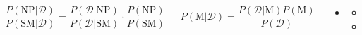 \documentclass[english]{beamer}
\begin{document}
{\begin{columns}[t]
{              $$ \frac{P(\mathrm{NP}|\mathcal{D})}{P(\mathrm{SM}|\mathcal{D})} =
                 \frac{P(\mathcal{D}|\mathrm{NP})}{P(\mathcal{D}|\mathrm{SM})} \cdot \frac{P(\mathrm{NP})}{P(\mathrm{SM})} $$

              $$ P(\mathrm{M} | \mathcal{D} ) = \frac{P(\mathcal{D} | \mathrm{M})P(\mathrm{M})}{P(\mathcal{D})} $$

          \begin{itemize}
          \item[]
              \begin{itemize}
                  \item[] 
                  \item[] 
              \end{itemize}
          \end{itemize}}

\end{columns}

}
\end{document}
